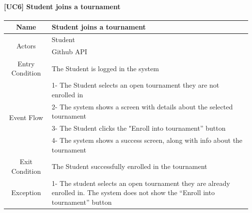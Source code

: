 \documentclass{article}
\begin{document}
\paragraph{[UC6] Student joins a tournament}
\begin{center}
\begin{tabular}{|c|m{40em}|}
\hline
Name & Student joins a tournament\\
\hline
\multirow{2}{4em}{Actors}
& Student\\
& Github API\\
\hline
Entry Condition & The Student is logged in the system\\
\hline
\multirow{4}{4em}{Event Flow}
&1- The Student selects an open tournament they are not enrolled in\\
&2- The system shows a screen with details about the selected tournament\\
&3- The Student clicks the "Enroll into tournament” button\\
&4- The system shows a success screen, along with info about the tournament\\
\hline
Exit Condition & The Student successfully enrolled in the tournament\\
\hline
Exception & 1- The student selects an open tournament they are already enrolled in. The system does not show the “Enroll into tournament” button\\
\hline
\end{tabular}
\end{center}

\newpage
\end{document}

